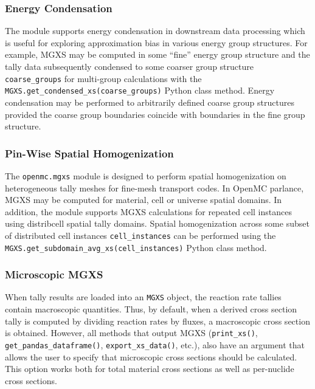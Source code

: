 \subsubsection{Energy Condensation}
\label{subsec:energy-condense}

The module supports energy condensation in downstream data processing which is useful for exploring approximation bias in various energy group structures. For example, MGXS may be computed in some ``fine'' energy group structure and the tally data subsequently condensed to some coarser group structure \texttt{coarse_groups} for multi-group calculations with the \texttt{MGXS.get_condensed_xs(coarse_groups)} Python class method. Energy condensation may be performed to arbitrarily defined coarse group structures provided the coarse group boundaries coincide with boundaries in the fine group structure.


\subsubsection{Pin-Wise Spatial Homogenization}
\label{subsec:pinwise-homogenize}

The \texttt{openmc.mgxs} module is designed to perform spatial homogenization on heterogeneous tally meshes for fine-mesh transport codes. In OpenMC parlance, MGXS may be computed for material, cell or universe spatial domains. In addition, the module supports MGXS calculations for repeated cell instances using distribcell spatial tally domains\cite{lax2014distribcell}. Spatial homogenization across some subset of distributed cell instances \texttt{cell_instances} can be performed using the \texttt{MGXS.get_subdomain_avg_xs(cell_instances)} Python class method.



\subsubsection{Microscopic MGXS}
\label{subsec:micro-macro}

When tally results are loaded into an \texttt{MGXS} object, the reaction rate tallies contain macroscopic quantities. Thus, by default, when a derived cross section tally is computed by dividing reaction rates by fluxes, a macroscopic cross section is obtained. However, all methods that output MGXS (\texttt{print_xs()}, \texttt{get_pandas_dataframe()}, \texttt{export_xs_data()}, etc.), also have an argument that allows the user to specify that microscopic cross sections should be calculated. This option works both for total material cross sections as well as per-nuclide cross sections.

